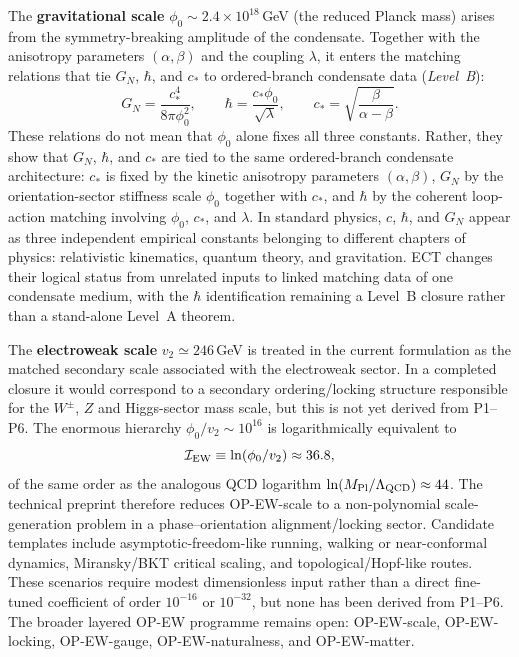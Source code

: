 \documentclass[11pt,a4paper]{article}
\begin{document}
The \textbf{gravitational scale} $\phi_0 \sim 2.4 \times 10^{18}$\,GeV (the reduced Planck mass) arises from the symmetry-breaking amplitude of the condensate. Together with the anisotropy parameters $(\alpha,\beta)$ and the coupling $\lambda$, it enters the matching relations that tie $G_N$, $\hbar$, and $c_*$ to ordered-branch condensate data (\emph{Level~B}):
\begin{equation}
  G_N = \frac{c_*^4}{8\pi\phi_0^2}, \qquad
  \hbar = \frac{c_*\phi_0}{\sqrt{\lambda}}, \qquad
  c_* = \sqrt{\frac{\beta}{\alpha-\beta}}.
  \label{eq:pop_matching}
\end{equation}
These relations do not mean that $\phi_0$ alone fixes all three constants. Rather, they show that $G_N$, $\hbar$, and $c_*$ are tied to the same ordered-branch condensate architecture: $c_*$ is fixed by the kinetic anisotropy parameters $(\alpha,\beta)$, $G_N$ by the orientation-sector stiffness scale $\phi_0$ together with $c_*$, and $\hbar$ by the coherent loop-action matching involving $\phi_0$, $c_*$, and $\lambda$. In standard physics, $c$, $\hbar$, and $G_N$ appear as three independent empirical constants belonging to different chapters of physics: relativistic kinematics, quantum theory, and gravitation. ECT changes their logical status from unrelated inputs to linked matching data of one condensate medium, with the $\hbar$ identification remaining a Level~B closure rather than a stand-alone Level~A theorem.

The \textbf{electroweak scale} $v_2\simeq246$\,GeV is treated in the current formulation as the matched secondary scale associated with the electroweak sector. In a completed closure it would correspond to a secondary ordering/locking structure responsible for the $W^\pm$, $Z$ and Higgs-sector mass scale, but this is not yet derived from P1--P6. The enormous hierarchy $\phi_0/v_2\sim10^{16}$ is logarithmically equivalent to
\[
  \mathcal{I}_{\rm EW}\equiv\ln(\phi_0/v_2)\approx36.8,
\]
of the same order as the analogous QCD logarithm $\ln(M_{\rm Pl}/\Lambda_{\rm QCD})\approx44$. The technical preprint therefore reduces OP-EW-scale to a non-polynomial scale-generation problem in a phase--orientation alignment/locking sector. Candidate templates include asymptotic-freedom-like running, walking or near-conformal dynamics, Miransky/BKT critical scaling, and topological/Hopf-like routes. These scenarios require modest dimensionless input rather than a direct fine-tuned coefficient of order $10^{-16}$ or $10^{-32}$, but none has been derived from P1--P6. The broader layered OP-EW programme remains open: OP-EW-scale, OP-EW-locking, OP-EW-gauge, OP-EW-naturalness, and OP-EW-matter.
\end{document}
